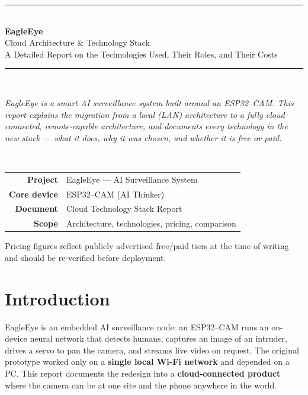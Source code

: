 \documentclass[11pt,a4paper]{article}
\begin{document}
\begin{titlepage}
\centering
\vspace*{2cm}
{\color{eagleblue}\rule{\linewidth}{1.4pt}}\\[0.5cm]
{\Huge\bfseries\color{eagleblue} EagleEye}\\[0.35cm]
{\LARGE Cloud Architecture \& Technology Stack}\\[0.25cm]
{\large\color{eaglegray} A Detailed Report on the Technologies Used, Their Roles, and Their Costs}\\[0.4cm]
{\color{eagleblue}\rule{\linewidth}{1.4pt}}\\[1.2cm]

\begin{minipage}{0.86\linewidth}\centering\itshape\color{eaglegray}
EagleEye is a smart AI surveillance system built around an ESP32--CAM. This report
explains the migration from a local (LAN) architecture to a fully cloud-connected,
remote-capable architecture, and documents every technology in the new stack ---
what it does, why it was chosen, and whether it is free or paid.
\end{minipage}\\[1.6cm]

\begin{tabular}{rl}
\textbf{Project} & EagleEye --- AI Surveillance System \\[2pt]
\textbf{Core device} & ESP32--CAM (AI Thinker) \\[2pt]
\textbf{Document} & Cloud Technology Stack Report \\[2pt]
\textbf{Scope} & Architecture, technologies, pricing, comparison \\
\end{tabular}
\vfill
{\color{eaglegray}\small Pricing figures reflect publicly advertised free/paid tiers at the time of writing and should be re-verified before deployment.}
\end{titlepage}

\tableofcontents
\newpage

\section{Introduction}
EagleEye is an embedded AI surveillance node: an ESP32--CAM runs an on-device neural network
that detects humans, captures an image of an intruder, drives a servo to pan the camera, and
streams live video on request. The original prototype worked only on a \textbf{single local
Wi-Fi network} and depended on a PC. This report documents the redesign into a
\textbf{cloud-connected product} where the camera can be at one site and the phone anywhere in
the world.
\end{document}
